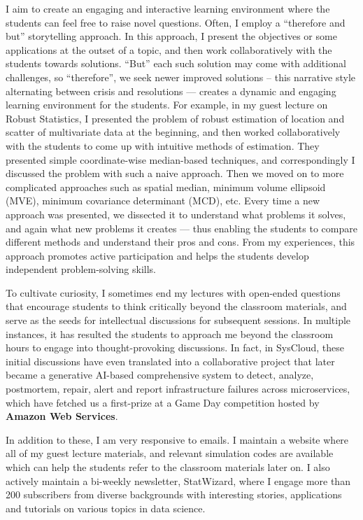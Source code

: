 \documentclass[a4paper,10pt]{article}
\begin{document}
I aim to create an engaging and interactive learning environment where the students can feel free to raise novel questions. Often, I employ a ``therefore and but'' storytelling approach. In this approach, I present the objectives or some applications at the outset of a topic, and then work collaboratively with the students towards solutions. “But” each such solution may come with additional challenges, so ``therefore'', we seek newer improved solutions – this narrative style alternating between crisis and resolutions — creates a dynamic and engaging learning environment for the students. For example, in my guest lecture on Robust Statistics, I presented the problem of robust estimation of location and scatter of multivariate data at the beginning, and then worked collaboratively with the students to come up with intuitive methods of estimation. They presented simple coordinate-wise median-based techniques, and correspondingly I discussed the problem with such a naive approach. Then we moved on to more complicated approaches such as spatial median, minimum volume ellipsoid (MVE), minimum covariance determinant (MCD), etc. Every time a new approach was presented, we dissected it to understand what problems it solves, and again what new problems it creates --- thus enabling the students to compare different methods and understand their pros and cons. From my experiences, this approach promotes active participation and helps the students develop independent problem-solving skills. 

To cultivate curiosity, I sometimes end my lectures with open-ended questions that encourage students to think critically beyond the classroom materials, and serve as the seeds for intellectual discussions for subsequent sessions. In multiple instances, it has resulted the students to approach me beyond the classroom hours to engage into thought-provoking discussions. In fact, in SysCloud, these initial discussions have even translated into a collaborative project that later became a generative AI-based comprehensive system to detect, analyze, postmortem, repair, alert and report infrastructure failures across microservices, which have fetched us a first-prize at a Game Day competition hosted by \textbf{Amazon Web Services}.

In addition to these, I am very responsive to emails. I maintain a website where all of my guest lecture materials, and relevant simulation codes are available which can help the students refer to the classroom materials later on. I also actively maintain a bi-weekly newsletter, StatWizard, where I engage more than 200 subscribers from diverse backgrounds with interesting stories, applications and tutorials on various topics in data science.
\end{document}
